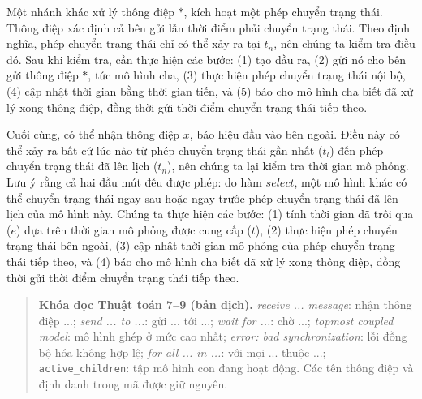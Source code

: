 Một nhánh khác xử lý thông điệp $*$, kích hoạt một phép chuyển trạng thái. Thông điệp xác định cả bên gửi lẫn thời điểm phải chuyển trạng thái. Theo định nghĩa, phép chuyển trạng thái chỉ có thể xảy ra tại $t_n$, nên chúng ta kiểm tra điều đó. Sau khi kiểm tra, cần thực hiện các bước: (1) tạo đầu ra, (2) gửi nó cho bên gửi thông điệp $*$, tức mô hình cha, (3) thực hiện phép chuyển trạng thái nội bộ, (4) cập nhật thời gian bằng thời gian tiến, và (5) báo cho mô hình cha biết đã xử lý xong thông điệp, đồng thời gửi thời điểm chuyển trạng thái tiếp theo.

Cuối cùng, có thể nhận thông điệp $x$, báo hiệu đầu vào bên ngoài. Điều này có thể xảy ra bất cứ lúc nào từ phép chuyển trạng thái gần nhất ($t_l$) đến phép chuyển trạng thái đã lên lịch ($t_n$), nên chúng ta lại kiểm tra thời gian mô phỏng. Lưu ý rằng cả hai đầu mút đều được phép: do hàm $select$, một mô hình khác có thể chuyển trạng thái ngay sau hoặc ngay trước phép chuyển trạng thái đã lên lịch của mô hình này. Chúng ta thực hiện các bước: (1) tính thời gian đã trôi qua ($e$) dựa trên thời gian mô phỏng được cung cấp ($t$), (2) thực hiện phép chuyển trạng thái bên ngoài, (3) cập nhật thời gian mô phỏng của phép chuyển trạng thái tiếp theo, và (4) báo cho mô hình cha biết đã xử lý xong thông điệp, đồng thời gửi thời điểm chuyển trạng thái tiếp theo.

\begin{quote}\small
\textbf{Khóa đọc Thuật toán 7--9 (bản dịch).} \emph{receive ... message}: nhận thông điệp ...; \emph{send ... to ...}: gửi ... tới ...; \emph{wait for ...}: chờ ...; \emph{topmost coupled model}: mô hình ghép ở mức cao nhất; \emph{error: bad synchronization}: lỗi đồng bộ hóa không hợp lệ; \emph{for all ... in ...}: với mọi ... thuộc ...; \texttt{active\_children}: tập mô hình con đang hoạt động. Các tên thông điệp và định danh trong mã được giữ nguyên.
\end{quote}

